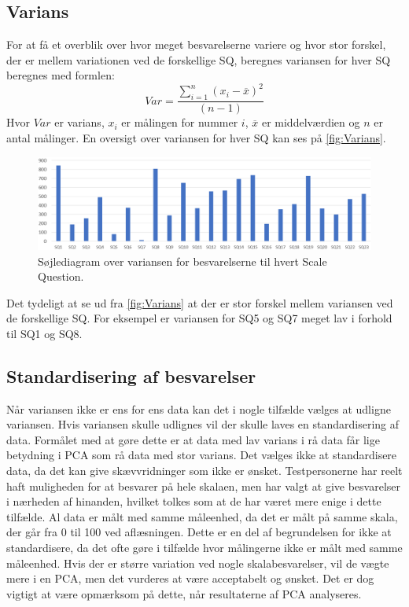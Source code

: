 \subsection{Varians}
%
For at få et overblik over hvor meget besvarelserne variere og hvor stor forskel, der er mellem variationen ved de forskellige SQ, beregnes variansen for hver SQ beregnes med formlen: \blankline
%
\begin{equation}
	Var = \frac{\sum_{i=1}^{n}(x_i-\overline{x})^{2}}{(n-1)}
\end{equation}
\noindent
%
Hvor $Var$ er varians, $x_i$ er målingen for nummer $i$, $\overline{x}$ er middelværdien og $n$ er antal målinger. 
En oversigt over variansen for hver SQ kan ses på \autoref{fig:Varians}. 
%
\begin{figure}[H]
\centering
\includegraphics[width = \textwidth]{Figure/DatabehandlingSkalaer/Varians} 
\caption{Søjlediagram over variansen for besvarelserne til hvert Scale Question.}
\label{fig:Varians}
\end{figure}
\noindent
%
Det tydeligt at se ud fra \autoref{fig:Varians} at der er stor forskel mellem variansen ved de forskellige SQ. For eksempel er variansen for SQ5 og SQ7 meget lav i forhold til SQ1 og SQ8. 
%
\subsection{Standardisering af besvarelser}
Når variansen ikke er ens for ens data kan det i nogle tilfælde vælges at udligne variansen. Hvis variansen skulle udlignes vil der skulle laves en standardisering af data. Formålet med at gøre dette er at data med lav varians i rå data får lige betydning i PCA som rå data med stor varians. \blankline
%
Det vælges ikke at standardisere data, da det kan give skævvridninger som ikke er ønsket. Testpersonerne har reelt haft muligheden for at besvarer på hele skalaen, men har valgt at give besvarelser i nærheden af hinanden, hvilket tolkes som at de har været mere enige i dette tilfælde. \blankline
%
Al data er målt med samme måleenhed, da det er målt på samme skala, der går fra 0 til 100 ved aflæsningen. Dette er en del af begrundelsen for ikke at standardisere, da det ofte gøre i tilfælde hvor målingerne ikke er målt med samme måleenhed. \blankline
%
Hvis der er større variation ved nogle skalabesvarelser, vil de vægte mere i en PCA, men det vurderes at være acceptabelt og ønsket. Det er dog vigtigt at være opmærksom på dette, når resultaterne af PCA analyseres. 
